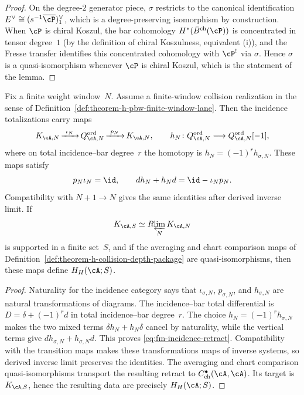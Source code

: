 \begin{proof}
On the degree-$2$ generator piece, $\sigma$ restricts to the
canonical identification $E^{\vee} \cong (s^{-1}\overline{\cP})^{\vee}_1$,
which is a degree-preserving isomorphism by construction.
When $\cP$ is chiral Koszul, the bar cohomology
$H^{*}(\bar{B}^{\mathrm{ch}}(\cP))$ is concentrated in
tensor degree~$1$ \textup{(}by the definition of chiral
Koszulness, equivalent
\textup{(}i\textup{)}\textup{)}, and the Fresse transfer
identifies this concentrated cohomology with $\cP^{!}$ via
$\sigma$. Hence $\sigma$ is a quasi-isomorphism whenever
$\cP$ is chiral Koszul, which is the statement of the lemma.
\end{proof}

\begin{proposition}
\label{prop:fm-tower-collapse}
Fix a finite weight window~\(N\).  Assume a
finite-window collision realization in the sense of
Definition~\ref{def:theorem-h-pbw-finite-window-lane}.  Then the
incidence totalizations carry maps
\[
 K_{\cA,N}
 \mathop{\xrightarrow{\ \iota_N\ }}
 Q^{\mathrm{ord}}_{\cA,N}
 \mathop{\xrightarrow{\ p_N\ }}
 K_{\cA,N},
 \qquad
 h_N\colon Q^{\mathrm{ord}}_{\cA,N}
 \longrightarrow Q^{\mathrm{ord}}_{\cA,N}[-1],
\]
where on total incidence--bar degree~\(r\) the homotopy is
\(h_N=(-1)^r h_{\sigma,N}\).  These maps satisfy
\begin{equation}\label{eq:fm-incidence-retract}
 p_N\iota_N=\id,
 \qquad
 d h_N+h_Nd=\id-\iota_Np_N.
\end{equation}
Compatibility with \(N+1\to N\) gives the same identities after
derived inverse limit.  If
\[
 K_{\cA,S}\simeq R\!\varprojlim_NK_{\cA,N}
\]
is supported in a finite set~\(S\), and if the averaging and chart
comparison maps of
Definition~\ref{def:theorem-h-collision-depth-package} are
quasi-isomorphisms, then these maps define \(H_H(\cA;S)\).

\end{proposition}

\begin{proof}
Naturality for the incidence category says that
\(\iota_{\sigma,N}\), \(p_{\sigma,N}\), and
\(h_{\sigma,N}\) are natural transformations of diagrams.  The
incidence--bar total differential is \(D=\delta+(-1)^r d\) in total
incidence--bar degree~\(r\).  The choice
\(h_N=(-1)^rh_{\sigma,N}\) makes the two
mixed terms \(\delta h_N+h_N\delta\) cancel by naturality, while the
vertical terms give \(dh_{\sigma,N}+h_{\sigma,N}d\).  This proves
\eqref{eq:fm-incidence-retract}.  Compatibility with the transition
maps makes these transformations maps of inverse systems, so derived
inverse limit preserves the identities.  The averaging and chart
comparison quasi-isomorphisms transport the resulting retract to
\(C^\bullet_{\mathrm{ch}}(\cA,\cA)\).  Its target is
\(K_{\cA,S}\), hence the resulting data are precisely
\(H_H(\cA;S)\).

\end{proof}

